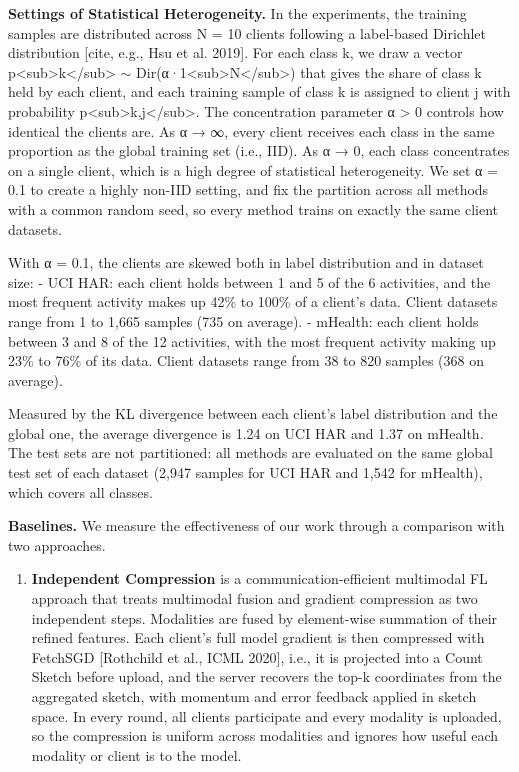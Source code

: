 \documentclass[sigconf]{acmart}
\begin{document}
{\bfseries Settings of Statistical Heterogeneity.}
 In the experiments, the training samples are distributed across N = 10 clients following a label-based Dirichlet distribution [cite, e.g., Hsu et al. 2019]. For each class k, we draw a vector p<sub>k</sub> $\sim$ Dir(α·1<sub>N</sub>) that gives the share of class k held by each client, and each training sample of class k is assigned to client j with probability p<sub>k,j</sub>. The concentration parameter α > 0 controls how identical the clients are. As α → ∞, every client receives each class in the same proportion as the global training set (i.e., IID). As α → 0, each class concentrates on a single client, which is a high degree of statistical heterogeneity. We set α = 0.1 to create a highly non-IID setting, and fix the partition across all methods with a common random seed, so every method trains on exactly the same client datasets.

With α = 0.1, the clients are skewed both in label distribution and in dataset size:
- UCI HAR: each client holds between 1 and 5 of the 6 activities, and the most frequent activity makes up 42\% to 100\% of a client's data. Client datasets range from 1 to 1,665 samples (735 on average).
- mHealth: each client holds between 3 and 8 of the 12 activities, with the most frequent activity making up 23\% to 76\% of its data. Client datasets range from 38 to 820 samples (368 on average).

Measured by the KL divergence between each client's label distribution and the global one, the average divergence is 1.24 on UCI HAR and 1.37 on mHealth. The test sets are not partitioned: all methods are evaluated on the same global test set of each dataset (2,947 samples for UCI HAR and 1,542 for mHealth), which covers all classes.

{\bfseries Baselines.}
We measure the effectiveness of our work through a comparison with two approaches.

\begin{enumerate}
    \item 
    {\bfseries Independent Compression}
     is a communication-efficient multimodal FL approach that treats multimodal fusion and gradient compression as two independent steps. Modalities are fused by element-wise summation of their refined features. Each client's full model gradient is then compressed with FetchSGD [Rothchild et al., ICML 2020], i.e., it is projected into a Count Sketch before upload, and the server recovers the top-k coordinates from the aggregated sketch, with momentum and error feedback applied in sketch space. In every round, all clients participate and every modality is uploaded, so the compression is uniform across modalities and ignores how useful each modality or client is to the model.
\end{enumerate}
\end{document}
